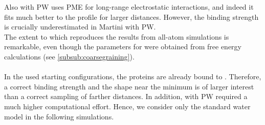 Also \martini{} with PW uses PME for long-range electrostatic interactions, and indeed it fits much better to the \charmm{} profile for larger distances. However, the binding strength is crucially underestimated in Martini with PW.\\
The extent to which \martini{} reproduces the results from all-atom simulations is remarkable, even though the parameters for \martini{} were obtained from free energy calculations (see \autoref{subsub:coarsegraining}).\\
\\
In the used starting configurations, the proteins are already bound to \pip{}. Therefore, a correct binding strength and the shape near the minimum is of larger interest than a correct sampling of farther distances. In addition, \martini{} with PW required a much higher computational effort. Hence, we consider only the standard water model in the following simulations.
